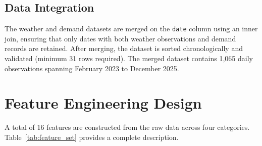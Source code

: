\subsection{Data Integration}

The weather and demand datasets are merged on the \texttt{date} column using an inner join, ensuring that only dates with both weather observations and demand records are retained. After merging, the dataset is sorted chronologically and validated (minimum 31 rows required). The merged dataset contains 1,065 daily observations spanning February 2023 to December 2025.


\section{Feature Engineering Design}\label{sec:feature_design}

A total of 16 features are constructed from the raw data across four categories. Table~\ref{tab:feature_set} provides a complete description.

